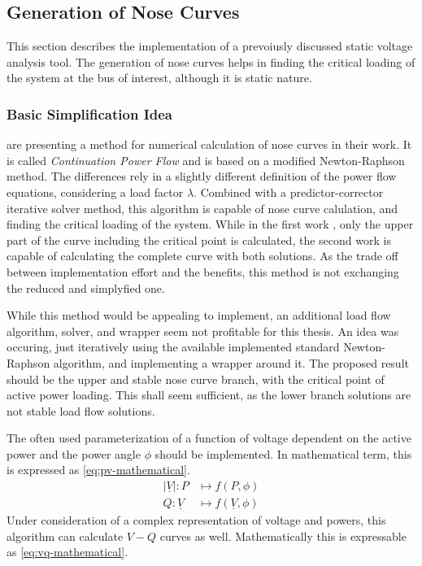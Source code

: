 \subsection{Generation of Nose Curves}
\label{sec:nose-curves}

This section describes the implementation of a prevoiusly discussed static voltage analysis tool.
The generation of nose curves helps in finding the critical loading of the system at the bus of interest, although it is static nature. 

\subsubsection{Basic Simplification Idea}

\textcite{ajjarapu_1992, ajjarapu_2007} are presenting a method for numerical calculation of nose curves in their work. 
It is called {\itshape Continuation Power Flow} and is based on a modified Newton-Raphson method.
The differences rely in a slightly different definition of the power flow equations, considering a load factor $\lambda$.
Combined with a predictor-corrector iterative solver method, this algorithm is capable of nose curve calulation, and finding the critical loading of the system.
While in the first work \autocite{ajjarapu_1992}, only the upper part of the curve including the critical point is calculated, the second work \autocite{ajjarapu_2007} is capable of calculating the complete curve with both solutions. 
As the trade off between implementation effort and the benefits, this method is not exchanging the reduced and simplyfied one.

While this method would be appealing to implement, an additional load flow algorithm, solver, and wrapper seem not profitable for this thesis.
An idea was occuring, just iteratively using the available implemented standard Newton-Raphson algorithm, and implementing a wrapper around it.
The proposed result should be the upper and stable nose curve branch, with the critical point of active power loading.
This shall seem sufficient, as the lower branch solutions are not stable load flow solutions.

The often used parameterization of a function of voltage dependent on the active power and the power angle $\phi$ should be implemented.
In mathematical term, this is expressed as \autoref{eq:pv-mathematical}.
\begin{align}
        \vert \underline{V} \vert : P &\mapsto f(P, \phi) \label{eq:pv-mathematical} \\[6pt]
        Q : \underline{V} &\mapsto f(\underline{V}, \phi) \label{eq:vq-mathematical}
\end{align}
Under consideration of a complex representation of voltage and powers, this algorithm can calculate $V-Q$ curves as well. 
Mathematically this is expressable as \autoref{eq:vq-mathematical}.

